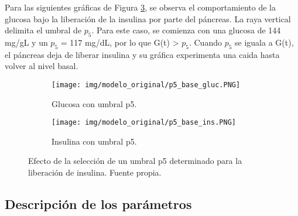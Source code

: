Para las siguientes gráficas de Figura \ref{fig:bergman_p5_base}, se observa el comportamiento de la glucosa bajo la liberación de la insulina por parte del páncreas. La raya vertical delimita el umbral de $p_5$. Para este caso, se comienza con una glucosa de 144 mg/gL y un $p_5$ = 117 mg/dL, por lo que G(t) > $p_5$. Cuando $p_5$ se iguala a G(t), el páncreas deja de liberar insulina y su gráfica experimenta una caida hasta volver al nivel basal.
\clearpage
\begin{figure}[htbp]
    \centering
    \begin{subfigure}[b]{0.9\linewidth} %
        \centering
        \texttt{[image: img/modelo\_original/p5\_base\_gluc.PNG]}
        \caption{Glucosa con umbral p5.}
        \label{fig:bergman_p5_glucosa}
    \end{subfigure}
    
    \vspace{0.5cm} %

    \begin{subfigure}[b]{0.9\linewidth} %
        \centering
        \texttt{[image: img/modelo\_original/p5\_base\_ins.PNG]}
        \caption{Insulina con umbral p5.}
        \label{fig:bergman_p5_insulina}
    \end{subfigure}
    
    \caption{Efecto de la selección de un umbral p5 determinado para la liberación de insulina. Fuente propia.}
    \label{fig:bergman_p5_base}
\end{figure}



\subsection{Descripción de los parámetros}

